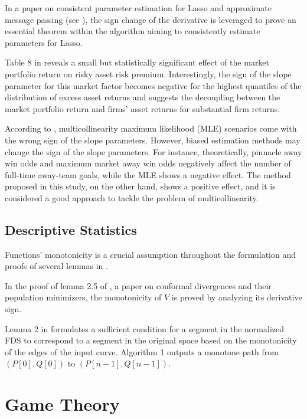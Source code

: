 \documentclass[11pt]{book}
\begin{document}
In a paper on consistent parameter estimation
for Lasso and approximate message passing (see \cite{mousavi2018consistent}), the sign change of the derivative is leveraged to prove an essential theorem within the algorithm aiming
to consistently estimate parameters for Lasso.

Table 8 in \cite{galvao2018testing} reveals a small but statistically
significant effect of the market portfolio return on risky asset risk
premium. Interestingly, the sign of the slope parameter for this market
factor becomes negative for the highest quantiles of the distribution
of excess asset returns and suggests the decoupling between the market
portfolio return and firms' asset returns for substantial firm returns.

According to \cite{qasim2020biased}, multicollinearity maximum likelihood (MLE) scenarios come with
the wrong sign of the slope parameters. However, biased estimation
methods may change the sign of the slope parameters. For instance,
theoretically, pinnacle away win odds and maximum market away win
odds negatively affect the number of full-time away-team goals, while
the MLE shows a negative effect. The method proposed in this study, on the other hand, shows
a positive effect, and it is considered a good approach to tackle
the problem of multicollinearity.


\subsection{Descriptive Statistics}

Functions' monotonicity is a crucial assumption throughout the formulation
and proofs of several lemmas in \cite{nock2015conformal}.

In the proof of lemma 2.5 of \cite{yang2017converses}, a paper on conformal divergences and
their population minimizers, the monotonicity
of $V$ is proved by analyzing its derivative sign. 

Lemma 2 in \cite{aghamolaei2020approximating} formulates a sufficient
condition for a segment in the normalized FDS to correspond to a segment
in the original space based on the monotonicity of the edges of the
input curve. Algorithm 1 outputs a monotone path from $\left(P\left[0\right],Q\left[0\right]\right)$
to $\left(P\left[n-1\right],Q\left[n-1\right]\right)$.


\section{Game Theory}
\end{document}
